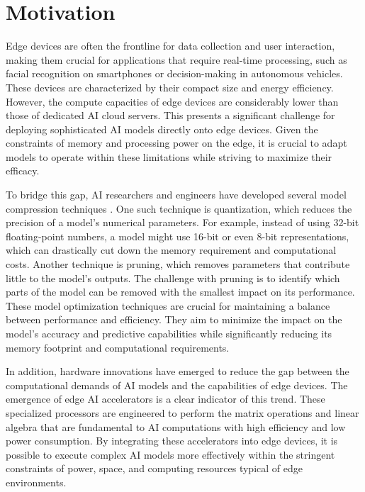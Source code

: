 \section{Motivation}
Edge devices are often the frontline for data collection and user interaction, making them crucial for applications that require real-time processing, such as facial recognition on smartphones or decision-making in autonomous vehicles.
These devices are characterized by their compact size and energy efficiency.
However, the compute capacities of edge devices are considerably lower than those of dedicated AI cloud servers.
This presents a significant challenge for deploying sophisticated AI models directly onto edge devices.
Given the constraints of memory and processing power on the edge, it is crucial to adapt models to operate within these limitations while striving to maximize their efficacy.

To bridge this gap, AI researchers and engineers have developed several model compression techniques \autocite{neillOverviewNeuralNetwork2020}.
One such technique is quantization, which reduces the precision of a model's numerical parameters.
For example, instead of using 32-bit floating-point numbers, a model might use 16-bit or even 8-bit representations, which can drastically cut down the memory requirement and computational costs.
Another technique is pruning, which removes parameters that contribute little to the model's outputs.
The challenge with pruning is to identify which parts of the model can be removed with the smallest impact on its performance.
These model optimization techniques are crucial for maintaining a balance between performance and efficiency.
They aim to minimize the impact on the model's accuracy and predictive capabilities while significantly reducing its memory footprint and computational requirements.

In addition, hardware innovations have emerged to reduce the gap between the computational demands of AI models and the capabilities of edge devices.
The emergence of edge AI accelerators is a clear indicator of this trend.
These specialized processors are engineered to perform the matrix operations and linear algebra that are fundamental to AI computations with high efficiency and low power consumption.
By integrating these accelerators into edge devices, it is possible to execute complex AI models more effectively within the stringent constraints of power, space, and computing resources typical of edge environments.

